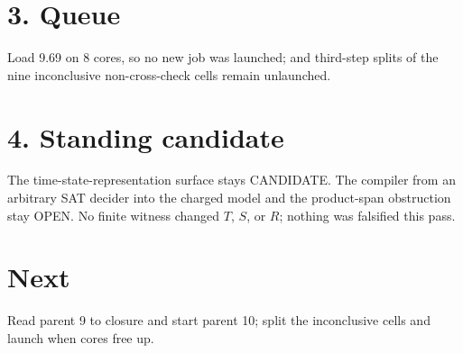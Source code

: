 \documentclass[11pt]{article}
\begin{document}
\section*{3. Queue}
Load 9.69 on 8 cores, so no new job was launched;  and third-step splits of the nine inconclusive non-cross-check cells remain unlaunched.

\section*{4. Standing candidate}
The time-state-representation surface stays CANDIDATE. The compiler from an arbitrary SAT decider into the charged model and the product-span obstruction stay OPEN. No finite witness changed $T$, $S$, or $R$; nothing was falsified this pass.

\section*{Next}
Read parent 9 to closure and start parent 10; split the inconclusive cells and launch  when cores free up.
\end{document}
